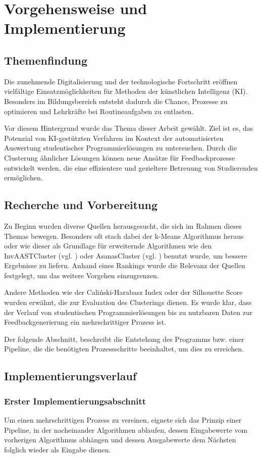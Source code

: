 \chapter{Vorgehensweise und Implementierung}

\section{Themenfindung}
Die zunehmende Digitalisierung und der technologische Fortschritt eröffnen vielfältige Einsatzmöglichkeiten für Methoden der künstlichen Intelligenz (KI). Besonders im Bildungsbereich entsteht dadurch die Chance, Prozesse zu optimieren und Lehrkräfte bei Routineaufgaben zu entlasten.

Vor diesem Hintergrund wurde das Thema dieser Arbeit gewählt. Ziel ist es, das Potenzial von KI-gestützten Verfahren im Kontext der automatisierten Auswertung studentischer Programmierlösungen zu untersuchen. Durch die Clusterung ähnlicher Lösungen können neue Ansätze für Feedbackprozesse entwickelt werden, die eine effizientere und gezieltere Betreuung von Studierenden ermöglichen.


\section{Recherche und Vorbereitung}
Zu Beginn wurden diverse Quellen herausgesucht, die sich im Rahmen dieses Themas bewegen. Besonders oft stach dabei der k-Means Algorithmus heraus oder wie dieser als Grundlage für erweiternde Algorithmen wie den InvAASTCluster (vgl. \cite{Orvalho.28.06.2022}) oder AsanasCluster (vgl. \cite{Paiva.2024}) benutzt wurde, um bessere Ergebnisse zu liefern. Anhand eines Rankings wurde die Relevanz der Quellen festgelegt, um das weitere Vorgehen einzugrenzen.

Andere Methoden wie der Caliński-Harabasz Index oder der Silhouette Score wurden erwähnt, die zur Evaluation des Clusterings dienen. Es wurde klar, dass der Verlauf von studentischen Programmierlösungen bis zu nutzbaren Daten zur Feedbackgenerierung ein mehrschrittiger Prozess ist.

Der folgende Abschnitt, beschreibt die Entstehung des Programms bzw. einer Pipeline, die die benötigten Prozessschritte beeinhaltet, um dies zu erreichen.


\section{Implementierungsverlauf}
\subsection{Erster Implementierungsabschnitt}
Um einen mehrschrittigen Prozess zu vereinen, eignete sich das Prinzip einer Pipeline, in der nacheinander Algorithmen ablaufen, dessen Eingabewerte vom vorherigen Algorithmus abhängen und dessen Ausgabewerte dem Nächsten folglich wieder als Eingabe dienen.


